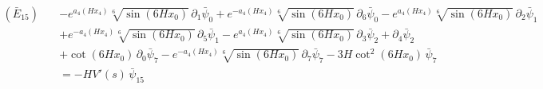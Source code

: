 \begin{align*}
(\bar E_{15})\quad & -e^{a_4\left(H x_4\right)} \sqrt[6]{\sin \left(6 H x_0\right)}\,\partial_{1}\bar\psi_{0} + e^{-a_4\left(H x_4\right)} \sqrt[6]{\sin \left(6 H x_0\right)}\,\partial_{6}\bar\psi_{0} - e^{a_4\left(H x_4\right)} \sqrt[6]{\sin \left(6 H x_0\right)}\,\partial_{2}\bar\psi_{1} \\
 &  + e^{-a_4\left(H x_4\right)} \sqrt[6]{\sin \left(6 H x_0\right)}\,\partial_{5}\bar\psi_{1} - e^{a_4\left(H x_4\right)} \sqrt[6]{\sin \left(6 H x_0\right)}\,\partial_{3}\bar\psi_{2} + \partial_{4}\bar\psi_{2} \\
 &  + \cot \left(6 H x_0\right)\,\partial_{0}\bar\psi_{7} - e^{-a_4\left(H x_4\right)} \sqrt[6]{\sin \left(6 H x_0\right)}\,\partial_{7}\bar\psi_{7} - 3 H \cot ^2\left(6 H x_0\right)\,\bar\psi_{7} \\
 & = -H V'(s)\,\bar\psi_{15}
\end{align*}
